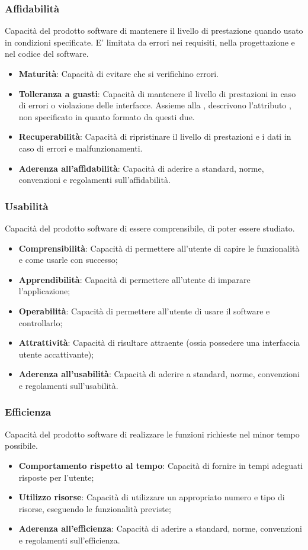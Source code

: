 \subsubsection{Affidabilità}
Capacità del prodotto software di mantenere il livello di prestazione quando usato in condizioni specificate.
E’ limitata da errori nei requisiti, nella progettazione e nel codice del software.
\begin{itemize}
\item \textbf{Maturità}: Capacità di evitare che si verifichino errori.
\item \textbf{Tolleranza a guasti}: Capacità di mantenere il livello di prestazioni in caso di errori o violazione delle interfacce. Assieme alla , descrivono l’attributo , non specificato in quanto formato da questi due.
\item \textbf{Recuperabilità}: Capacità di ripristinare il livello di prestazioni e i dati in caso di errori e malfunzionamenti.
\item \textbf{Aderenza all’affidabilità}: Capacità di aderire a standard, norme, convenzioni e regolamenti sull’affidabilità.
\end{itemize}

\subsubsection{Usabilità}
Capacità del prodotto software di essere comprensibile, di poter essere studiato.
\begin{itemize}
\item \textbf{Comprensibilità}: Capacità di permettere all’utente di capire le funzionalità e come usarle con successo;
\item \textbf{Apprendibilità}: Capacità di permettere all’utente di imparare l’applicazione;
\item \textbf{Operabilità}: Capacità di permettere all’utente di usare il software e controllarlo;
\item \textbf{Attrattività}: Capacità di risultare attraente (ossia possedere una interfaccia utente accattivante);
\item \textbf{Aderenza all’usabilità}: Capacità di aderire a standard, norme, convenzioni e regolamenti sull’usabilità.
\end{itemize}

\subsubsection{Efficienza}
Capacità del prodotto software di realizzare le funzioni richieste nel minor tempo possibile.
\begin{itemize}
\item \textbf{Comportamento rispetto al tempo}: Capacità di fornire in tempi adeguati risposte per l’utente;
\item \textbf{Utilizzo risorse}: Capacità di utilizzare un appropriato numero e tipo di risorse, eseguendo le funzionalità previste;
\item \textbf{Aderenza all’efficienza}: Capacità di aderire a standard, norme, convenzioni e regolamenti sull’efficienza.
\end{itemize}

